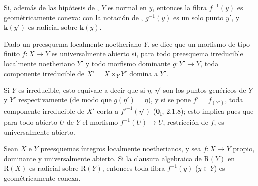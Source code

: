 \begin{remark}[4.3.8]
\label{III.4.3.8}
\label{III.4.3.8-fr}
Si, además de las hipótesis de , $Y$ es normal en
$y$, entonces la fibra $f^{-1}(y)$ es geométricamente conexa: con la
notación de , $g^{-1}(y)$ es un solo punto $y'$, y
$\boldsymbol{k}(y')$ es radicial sobre $\boldsymbol{k}(y)$.
\end{remark}

\begin{definition}[4.3.9]
\label{III.4.3.9-fr}
Dado un preesquema localmente noetheriano $Y$, se dice que un morfismo \textup{de
tipo finito} $f:X\to Y$ es universalmente abierto si, para todo
preesquema irreducible localmente noetheriano $Y'$ y todo morfismo dominante
$g:Y'\to Y$, toda componente irreducible de $X'=X\times_YY'$ domina a $Y'$.
\end{definition}

Si $Y$ es irreducible, esto equivale a decir que si $\eta$, $\eta'$ son los
puntos genéricos de $Y$ y $Y'$ respectivamente (de modo que
$g(\eta')=\eta$), y si se pone $f'=f_{(Y')}$, toda componente irreducible
de $X'$ corta a $f'^{-1}(\eta')$ (\textbf{0}\textsubscript{I}, 2.1.8); esto
implica pues que para todo abierto $U$ de $Y$ el morfismo
$f^{-1}(U)\to U$, restricción de $f$, es universalmente abierto.

\begin{corollary}[4.3.10]
\label{III.4.3.10}
\label{III.4.3.10-fr}
Sean $X$ e $Y$ preesquemas íntegros localmente noetherianos, y sea
$f:X\to Y$ propio, dominante y universalmente abierto. Si la clausura
algebraica de $\mathrm R(Y)$ en $\mathrm R(X)$ es radicial sobre
$\mathrm R(Y)$, entonces toda fibra $f^{-1}(y)$ ($y\in Y$) es geométricamente conexa.
\end{corollary}

